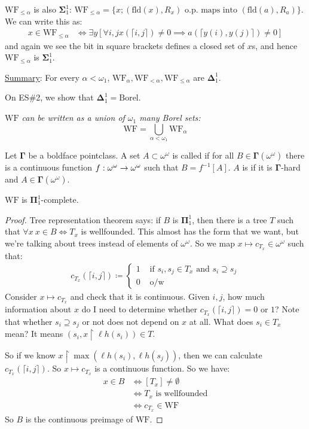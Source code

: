 \documentclass[]{article}
\newcommand{\om}{\omega}
\newcommand{\lh}{\ell h}
\newcommand{\bosig}{\bm{\Sigma}}
\newcommand{\bopi}{\bm{\Pi}}
\newcommand{\bodel}{\bm{\Delta}}
\newcommand{\fld}{\textrm{fld}}
\newcommand{\wf}{\textrm{WF}}
\newcommand{\bij}[1]{\lceil #1 \rceil}
\newcommand{\bog}{\bm{\Gamma}}
\begin{document}
$\wf_{\le\alpha}$ is also $\bosig^1_1$: $\wf_{\le\alpha} = \{x; (\fld(x),R_x)\textrm{ o.p. maps into }(\fld(a),R_a)\}$. We can write this as:
\begin{align*}
    x \in \wf_{\le\alpha} &\iff \exists y[\forall i,j x(\bij{i,j})\ne 0\implies a(\bij{y(i),y(j)})\ne 0]
\end{align*}
and again we see the bit in square brackets defines a closed set of $x$s, and hence $\wf_{\le\alpha}$ is $\bosig^1_1$.

\underline{Summary}: For every $\alpha < \om_1$, $\wf_\alpha,\wf_{<\alpha},\wf_{\le\alpha}$ are $\bodel^1_1$.

On ES\#2, we show that $\bodel^1_1 = \textrm{Borel}$.

\begin{remark*}[Corollary]
    \emph{
        $\wf$ can be written as a union of $\om_1$ many Borel sets: $$\wf = \bigcup_{\alpha < \om_1}\wf_\alpha$$
    }
\end{remark*}

\begin{defin*}[$\bog$-complete]
    Let $\bog$ be a boldface pointclass. A set $A\subset\om^\om$ is called \undf{$\bog$-hard} if for all $B \in \bog(\om^\om)$ there is a continuous function $f : \om^\om \ra \om^\om$ such that $B = f^{-1}[A]$. $A$ is \undf{$\bog$-complete} if it is $\bog$-hard and $A \in \bog(\om^\om)$.
\end{defin*}

\begin{theorem*}
    $\wf$ is $\bopi^1_1$-complete.
\end{theorem*}
\begin{proof}
    Tree representation theorem says: if $B$ is $\bopi^1_1$, then there is a tree $T$ such that $\forall x\ x\in B\iff T_x$ is wellfounded. This almost has the form that we want, but we're talking about trees instead of elements of $\om^\om$. So we map $x\mapsto c_{T_x} \in \om^\om$ such that:
    \begin{align*}
        c_{T_x}(\bij{i,j}) \coloneqq \left\lbrace \begin{array}{cl} 1 & \textrm{ if }s_i,s_j\in T_x\textrm{ and } s_i\supseteq s_j\\ 0 & \textrm{ o/w}\end{array}\right.
    \end{align*}
    Consider $x\mapsto c_{T_x}$ and check that it is continuous. Given $i,j$, how much information about $x$ do I need to determine whether $c_{T_x}(\bij{i,j}) = 0$ or $1$? Note that whether $s_i\supseteq s_j$ or not does not depend on $x$ at all. What does $s_i \in T_x$ mean? It means $(s_i,x\restriction \lh(s_i))\in T$.

    So if we know $x\restriction \max(\lh(s_i),\lh(s_j))$, then we can calculate $c_{T_x}(\bij{i,j})$. So $x\mapsto c_{T_x}$ is a continuous function. So we have:
    \begin{align*}
        x \in B &\iff [T_x]\ne\emptyset\\
        &\iff T_x\textrm{ is wellfounded}\\
        &\iff c_{T_x}\in \wf
    \end{align*}
    So $B$ is the continuous preimage of $\wf$.
\end{proof}
\end{document}
